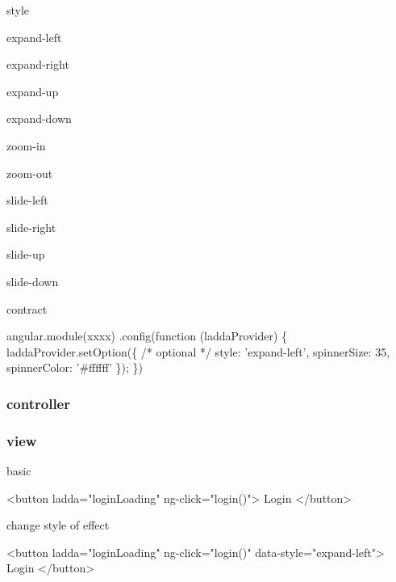 \begin{DoxyItemize}
\item style
\begin{DoxyItemize}
\item expand-\/left
\item expand-\/right
\item expand-\/up
\item expand-\/down
\item zoom-\/in
\item zoom-\/out
\item slide-\/left
\item slide-\/right
\item slide-\/up
\item slide-\/down
\item contract
\end{DoxyItemize}
\end{DoxyItemize}


\begin{DoxyCode}
angular.module(xxxx)
  .config(function (laddaProvider) \{
    laddaProvider.setOption(\{ /* optional */
      style: 'expand-left',
      spinnerSize: 35,
      spinnerColor: '#ffffff'
    \});
  \})
\end{DoxyCode}


\subsubsection*{controller}




\subsubsection*{view}

basic


\begin{DoxyCode}
<button ladda="loginLoading" ng-click="login()">
  Login
</button>
\end{DoxyCode}


change style of effect


\begin{DoxyCode}
<button ladda="loginLoading" ng-click="login()" data-style="expand-left">
  Login
</button>
\end{DoxyCode}


